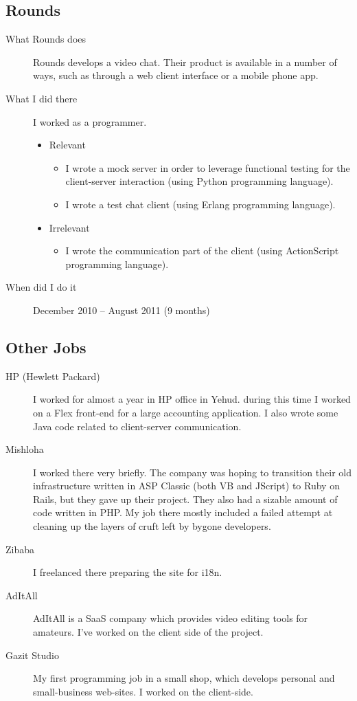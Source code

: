 \documentclass[11pt]{article}
\begin{document}
\subsection{Rounds}
\label{sec:orgheadline4}
\begin{description}
\item[{What Rounds does}] Rounds develops a video chat. Their product is available
in a number of ways, such as through a web client interface or a mobile
phone app.
\item[{What I did there}] I worked as a programmer.
\begin{itemize}
\item Relevant
\begin{itemize}
\item I wrote a mock server in order to leverage functional testing for the
client-server interaction (using Python programming language).
\item I wrote a test chat client (using Erlang programming language).
\end{itemize}
\item Irrelevant
\begin{itemize}
\item I wrote the communication part of the client (using ActionScript
programming language).
\end{itemize}
\end{itemize}

\item[{When did I do it}] December 2010 – August 2011 (9 months)
\end{description}

\subsection{Other Jobs}
\label{sec:orgheadline5}
\begin{description}
\item[{HP (Hewlett Packard)}] I worked for almost a year in HP office in Yehud.
during this time I worked on a Flex front-end for a large accounting
application.  I also wrote some Java code related to client-server
communication.
\item[{Mishloha}] I worked there very briefly.  The company was hoping to transition
their old infrastructure written in ASP Classic (both VB and JScript) to
Ruby on Rails, but they gave up their project.  They also had a sizable
amount of code written in PHP.  My job there mostly included a failed
attempt at cleaning up the layers of cruft left by bygone developers.
\item[{Zibaba}] I freelanced there preparing the site for i18n.
\item[{AdItAll}] AdItAll is a SaaS company which provides video editing tools for
amateurs.  I've worked on the client side of the project.
\item[{Gazit Studio}] My first programming job in a small shop, which develops
personal and small-business web-sites.  I worked on the client-side.
\end{description}
\end{document}
